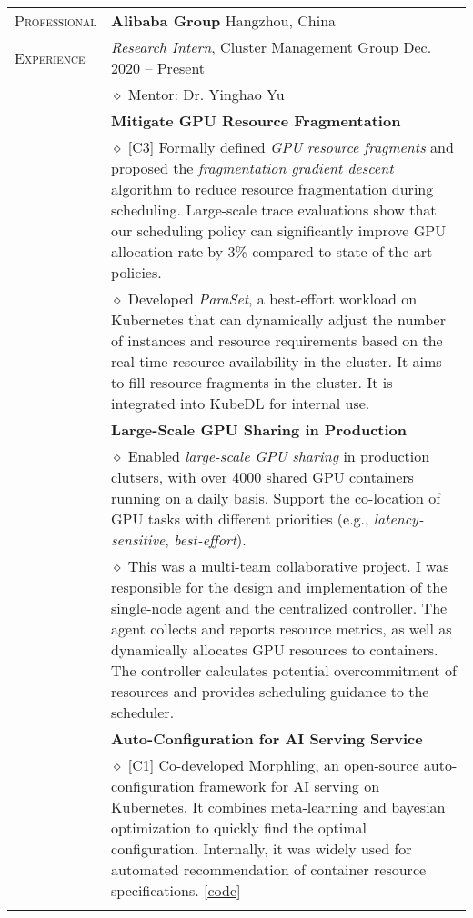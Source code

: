 \documentclass[letterpaper, 11pt]{article}
\begin{document}
\begin{longtable}{p{1in}p{5in}}
{\textsc{Professional}}
& {\textbf{Alibaba Group}} \hfill Hangzhou, China \\
{\textsc{Experience}}
& \textit{Research Intern}, Cluster Management Group \hfill Dec. 2020 -- Present \\
& $\diamond$ Mentor: Dr. Yinghao Yu \\
& \textbf{Mitigate GPU Resource Fragmentation} \\
    & $\diamond$ [C3] Formally defined \textit{GPU resource fragments} and proposed the \textit{fragmentation gradient descent} algorithm to reduce resource fragmentation during scheduling. Large-scale trace evaluations show that our scheduling policy can significantly improve GPU allocation rate by 3\% compared to state-of-the-art policies. \\
    & $\diamond$ Developed \textit{ParaSet}, a best-effort workload on Kubernetes that can dynamically adjust the number of instances and resource requirements based on the real-time resource availability in the cluster. It aims to fill resource fragments in the cluster. It is integrated into KubeDL for internal use. \\
& \textbf{Large-Scale GPU Sharing in Production} \\
    & $\diamond$ Enabled \textit{large-scale GPU sharing} in production clutsers, with over 4000 shared GPU containers running on a daily basis. Support the co-location of GPU tasks with different priorities (e.g., \textit{latency-sensitive}, \textit{best-effort}). \\
    & $\diamond$ This was a multi-team collaborative project. I was responsible for the design and implementation of the single-node agent and the centralized controller. The agent collects and reports resource metrics, as well as dynamically allocates GPU resources to containers. The controller calculates potential overcommitment of resources and provides scheduling guidance to the scheduler. \\
& \textbf{Auto-Configuration for AI Serving Service} \\
    & $\diamond$ [C1] Co-developed Morphling, an open-source auto-configuration framework for AI serving on Kubernetes. It combines meta-learning and bayesian optimization to quickly find the optimal configuration. Internally, it was widely used for automated recommendation of container resource specifications. [\href{https://github.com/kubedl-io/morphling}{\underline{code}}] \\
& \\


\end{longtable}
\end{document}
